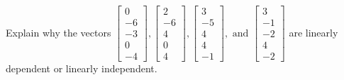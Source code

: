 \documentclass{article}
\begin{document}

\begin{exerciseStatement}
    Explain why the vectors \(\left[\begin{array}{r}
0 \\
-6 \\
-3 \\
0 \\
-4
\end{array}\right] , \left[\begin{array}{r}
2 \\
-6 \\
4 \\
0 \\
4
\end{array}\right] , \left[\begin{array}{r}
3 \\
-5 \\
4 \\
4 \\
-1
\end{array}\right] , \text{ and } \left[\begin{array}{r}
3 \\
-1 \\
-2 \\
4 \\
-2
\end{array}\right]\) are linearly dependent or linearly independent.


  
\end{exerciseStatement}
\end{document}
